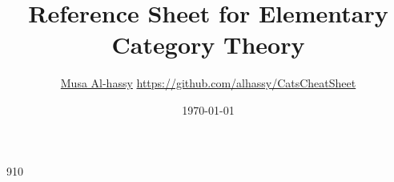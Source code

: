 \documentclass[11pt]{article}
\author{\href{http://www.cas.mcmaster.ca/\~alhassm/}{Musa Al-hassy} {\tiny\hspace{5.5em}\url{https://github.com/alhassy/CatsCheatSheet}}}
\date{\today}
\title{Reference Sheet for Elementary Category Theory}
\def\maketitle#1{}
\begin{document}
\maketitle

\fontsize{9}{10}\selectfont

\theauthor \hfill \thedate
\hline
{\center \large\bf \thetitle \\ }




%
% 
\makeatletter
\renewcommand\section[1]{
  \@startsection {section}{1}{0ex}%
                 {-3.5ex \@plus -1ex \@minus -.2ex}%
                 {-1em}%
		 { \color{black}\normalfont\bfseries}* {\fbox{#1} \vspace{1ex}\newline }}
		 
\makeatother


\def\labelitemi{$\diamond$}
\def\labelitemii{$\circ$}
\def\labelitemiii{$\star$}

% 


\renewenvironment{parallel}[1][2] %
 {
  \setlength{\columnseprule}{2pt}
  \begin{minipage}[t]{\linewidth} %
  \begin{multicols}{#1}  %
 }
 { 
  \end{multicols}
  \end{minipage}
 }

\newenvironment{parallel3}
 {
  \setlength{\columnseprule}{2pt}
  \begin{minipage}[t]{\linewidth} %
  \begin{multicols}{3}
 }
 { 
  \end{multicols}
  \end{minipage}
 }
\end{document}
